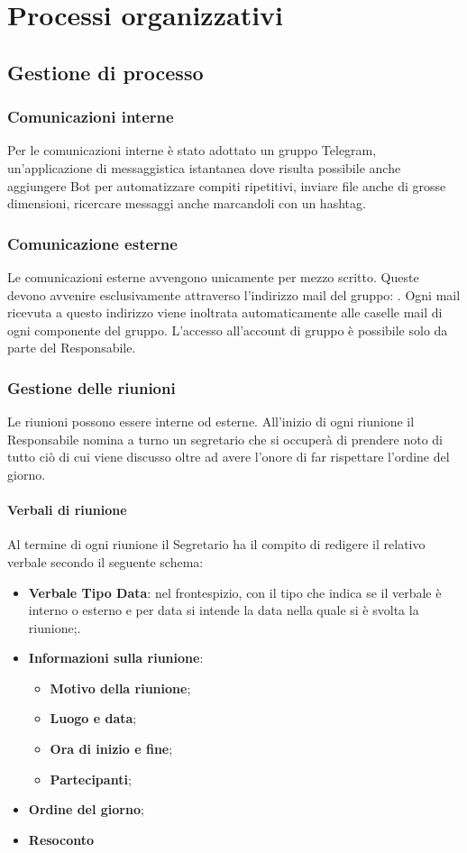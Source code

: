 \chapter{Processi organizzativi}
\section{Gestione di processo}
\subsection{Comunicazioni interne}
Per le comunicazioni interne è stato adottato un gruppo Telegram, un'applicazione di messaggistica istantanea dove risulta possibile anche aggiungere Bot per automatizzare compiti ripetitivi, inviare file anche di grosse dimensioni, ricercare messaggi anche marcandoli con un hashtag.
\subsection{Comunicazione esterne}
Le comunicazioni esterne avvengono unicamente per mezzo scritto. 
Queste devono avvenire esclusivamente attraverso l'indirizzo mail del gruppo: \mailzeroseven.
Ogni mail ricevuta a questo indirizzo viene inoltrata automaticamente alle caselle mail di ogni componente del gruppo. L'accesso all'account di gruppo è possibile solo da parte del Responsabile.
\subsection{Gestione delle riunioni}
Le riunioni possono essere interne od esterne. 
All'inizio di ogni riunione il Responsabile nomina a turno un segretario che si occuperà di prendere noto di tutto ciò di cui viene discusso oltre ad avere l'onore di far rispettare l'ordine del giorno.
\subsubsection{Verbali di riunione}
Al termine di ogni riunione il Segretario ha il compito di redigere il relativo verbale secondo il seguente schema:
\begin{itemize}
	\item \textbf{Verbale Tipo Data}: nel frontespizio, con il tipo che indica se il verbale è interno o esterno e per data si intende la data nella quale si è svolta la riunione;.
	\item \textbf{Informazioni sulla riunione}:
	\begin{itemize}
			\item \textbf{Motivo della riunione};
			\item \textbf{Luogo e data};
			\item \textbf{Ora di inizio e fine};
			\item \textbf{Partecipanti};
	\end{itemize}
	\item \textbf{Ordine del giorno};
	\item \textbf{Resoconto}
\end{itemize}
